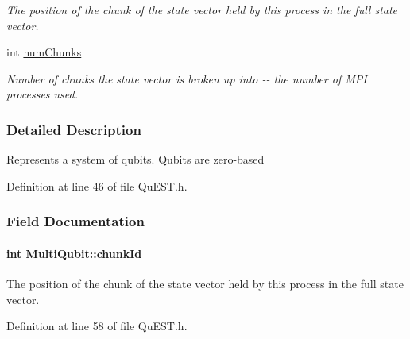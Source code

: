 \begin{DoxyCompactItemize}
\begin{DoxyCompactList}\small\item\em The position of the chunk of the state vector held by this process in the full state vector. \item\end{DoxyCompactList}\item 
int \hyperlink{structMultiQubit_acd43f2f57991709c9e94f73662c972b2}{numChunks}
\begin{DoxyCompactList}\small\item\em Number of chunks the state vector is broken up into -\/-\/ the number of MPI processes used. \item\end{DoxyCompactList}\end{DoxyCompactItemize}


\subsubsection{Detailed Description}
Represents a system of qubits. Qubits are zero-\/based 

Definition at line 46 of file QuEST.h.

\subsubsection{Field Documentation}
\hypertarget{structMultiQubit_ab10c88249fa3825d6227ceec01d37e37}{
\paragraph[{chunkId}]{\setlength{\rightskip}{0pt plus 5cm}int {\bf MultiQubit::chunkId}}\hfill}
\label{structMultiQubit_ab10c88249fa3825d6227ceec01d37e37}


The position of the chunk of the state vector held by this process in the full state vector. 

Definition at line 58 of file QuEST.h.

